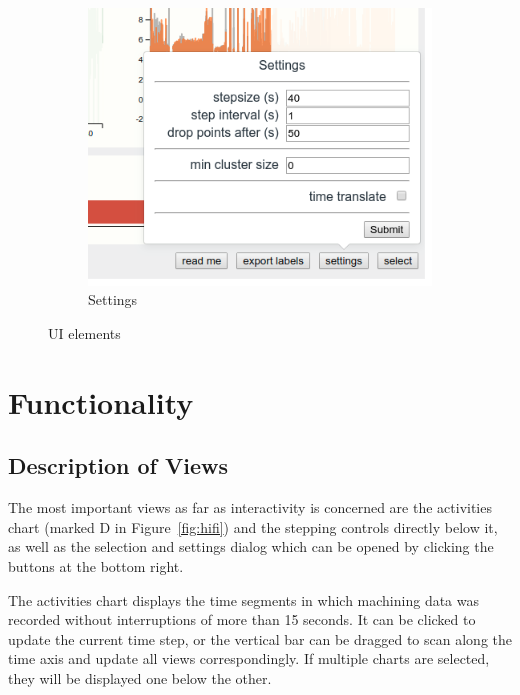 \documentclass[naustrian]{scrartcl}
\begin{document}
\begin{figure}
\begin{subfigure}{0.5\textwidth}
    \end{subfigure}
    \\
    \begin{subfigure}{0.5\textwidth}
        \centering
        \includegraphics[width=\textwidth]{img/settings.png}
        \caption{Settings}
        \label{fig:label}
    \end{subfigure}
    \caption{UI elements}
\end{figure}

\section{Functionality}

\subsection{Description of Views}

The most important views as far as interactivity is concerned are the
activities chart (marked D in Figure~\ref{fig:hifi}) and the stepping
controls directly below it, as well as the selection and settings dialog which
can be opened by clicking the buttons at the bottom right.

The activities chart displays the time segments in which machining data was
recorded without interruptions of more than 15 seconds. It can be clicked to
update the current time step, or the vertical bar can be dragged to scan along
the time axis and update all views correspondingly. If multiple charts are selected,
they will be displayed one below the other.
\end{document}
